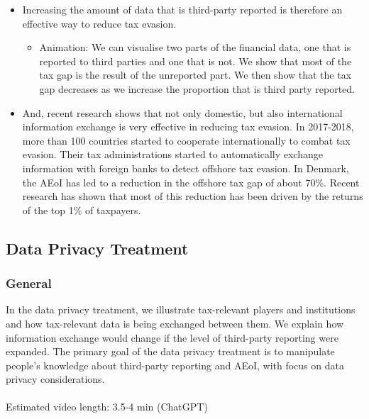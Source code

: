 \documentclass[11pt]{article}
\begin{document}
\begin{itemize}
\item Increasing the amount of data that is third-party reported is therefore an effective way to reduce tax evasion.
\begin{itemize}
    \item Animation: We can visualise two parts of the financial data, one that is reported to third parties and one that is not. We show that most of the tax gap is the result of the unreported part. We then show that the tax gap decreases as we increase the proportion that is third party reported.
\end{itemize}
\item And, recent research shows that not only domestic, but also international information exchange is very effective in reducing tax evasion. In 2017-2018, more than 100 countries started to cooperate internationally to combat tax evasion. Their tax administrations started to automatically exchange information with foreign banks to detect offshore tax evasion. In Denmark, the AEoI has led to a reduction in the offshore tax gap of about 70\%. Recent research has shown that most of this reduction has been driven by the returns of the top 1\% of taxpayers.
\end{itemize}
\subsection{Data Privacy Treatment}
\subsubsection*{General}
In the data privacy treatment, we illustrate tax-relevant players and institutions and how tax-relevant data is being exchanged between them. We explain how information exchange would change if the level of third-party reporting were expanded. The primary goal of the data privacy treatment is to manipulate people’s knowledge about third-party reporting and AEoI, with focus on data privacy considerations.\\ \\  
Estimated video length: 3.5-4 min (ChatGPT)
\end{document}
